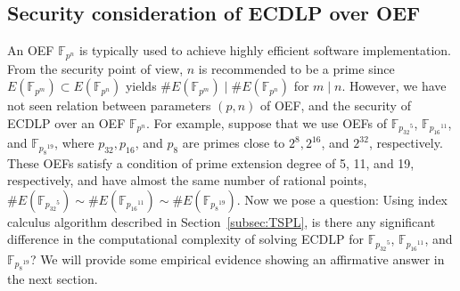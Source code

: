 \documentclass{llncs}
\newcommand{\F}[1]{\ensuremath{\mathbb F_{#1}}}
\def\Fqn{{\mathbb F}_{p^n}}
\def\Fqm{{\mathbb F}_{p^m}}
\begin{document}
\subsection{Security consideration of ECDLP over OEF}
%
An OEF $\Fqn$ is typically used to achieve highly efficient software
implementation.
%
From the security point of view, $n$ is recommended to be a prime
since $E(\Fqm) \subset E(\Fqn)$ yields $\#E(\Fqm) \mid \# E(\Fqn)$ for
$m \mid n$.
%
However, we have not seen relation between parameters $(p, n)$ of OEF,
and the security of ECDLP over an OEF $\Fqn$.
%
For example, suppose that we use OEFs of $\F{{p_{32}}^5}$,
$\F{{p_{16}}^{11}}$, and $\F{{p_{8}}^{19}}$, where $p_{32}, p_{16}$,
and $p_{8}$ are primes close to $2^8, 2^{16}$, and $2^{32}$,
respectively.
%
These OEFs satisfy a condition of prime extension degree of 5, 11, and
19, respectively, and have almost the same number of rational points,
$\#E(\F{{p_{32}}^5}) \sim \#E(\F{{p_{16}}^{11}}) \sim
\#E(\F{{p_{8}}^{19}})$.
%
Now we pose a question: Using index calculus algorithm described in
Section~\ref{subsec:TSPL}, is there any significant difference in the
computational complexity of solving ECDLP for $\F{{p_{32}}^5}$,
$\F{{p_{16}}^{11}}$, and $\F{{p_{8}}^{19}}$?
%
We will provide some empirical evidence showing an affirmative answer
in the next section.
\end{document}
